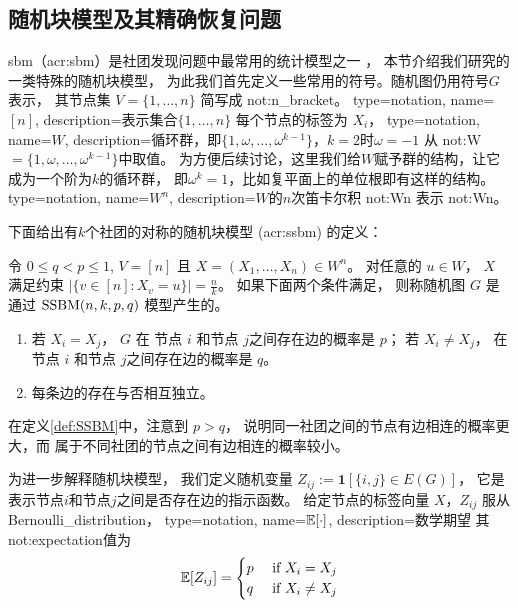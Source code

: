 \subsection{随机块模型及其精确恢复问题}\label{sec:exact_recovery}
\gls{sbm}（\gls{acr:sbm}）是社团发现问题中最常用的统计模型之一
\cite{holland1983stochastic, abbe2017community}，
本节介绍我们研究的一类特殊的随机块模型，
%
为此我们首先定义一些常用的符号。随机图仍用符号$G$表示，
其节点集 $V=\{1,\dots, n\}$ 简写成 \gls{not:n_bracket}。
{
  type=notation,
  name={\ensuremath{[n]}},
  description={表示集合$\{1,\dots, n\}$}
}
每个节点的标签为 $X_i$，
{
  type=notation,
  name={\ensuremath{W}},
  description={循环群，即$\{1, \omega, \dots, \omega^{k-1}\}$，$k=2$时$\omega=-1$}
}
从 \gls{not:W} $= \{1, \omega, \dots, \omega^{k-1}\}$中取值。
为方便后续讨论，这里我们给$W$赋予群的结构，让它成为一个阶为$k$的循环群，
即$\omega^k=1$，比如复平面上的单位根即有这样的结构。
{
  type=notation,
  name={\ensuremath{W^n}},
  description={$W$的$n$次笛卡尔积}
}
\gls{not:Wn} 表示 \glsdesc{not:Wn}。 

下面给出有$k$个社团的对称的随机块模型
(\gls{acr:ssbm})
的定义： 
	\begin{definition}\label{def:SSBM}
	令 $0\leq q<p\leq 1$, $V=[n]$ 且
  $X=(X_1,\dots,X_n)\in W^n$。 对任意的 $u\in W$，
  $X$ 满足约束
  $|\{v \in [n] : X_v = u\}| = \frac{n}{k}$。
	如果下面两个条件满足，
  则称随机图 $G$ 是通过 $\operatorname{SSBM}(n,k,p,q)$ 模型产生的。 
	\begin{enumerate}
	\item 若 $X_i=X_j$， $G$ 在 节点 $i$ 和节点 $j$之间存在边的概率是 $p$； 
 若 $X_i \neq X_j$，  在 节点 $i$ 和节点 $j$之间存在边的概率是 $q$。
	\item 每条边的存在与否相互独立。
	\end{enumerate}
\end{definition}

在定义\ref{def:SSBM}中，注意到 $p>q$，
说明同一社团之间的节点有边相连的概率更大，而
属于不同社团的节点之间有边相连的概率较小。

为进一步解释随机块模型，
我们定义随机变量 $Z_{ij}:=\mathbf{1}[\{i,j\} \in E(G)]$，
它是表示节点$i$和节点$j$之间是否存在边的指示函数。
给定节点的标签向量 $X$，$Z_{ij}$ 服从\gls{Bernoulli_distribution}，
{
  type=notation,
  name={$\operatorname{\mathbb{E}}[\cdot]$},
  description={数学期望}
}
其\glsdesc{not:expectation}值为
\begin{equation}
\operatorname{\mathbb{E}}[Z_{ij}] =
\begin{cases}
p & \textrm{ if } X_i = X_j \\ 
q & \textrm{ if }  X_i \neq X_j
\end{cases}
\end{equation}


